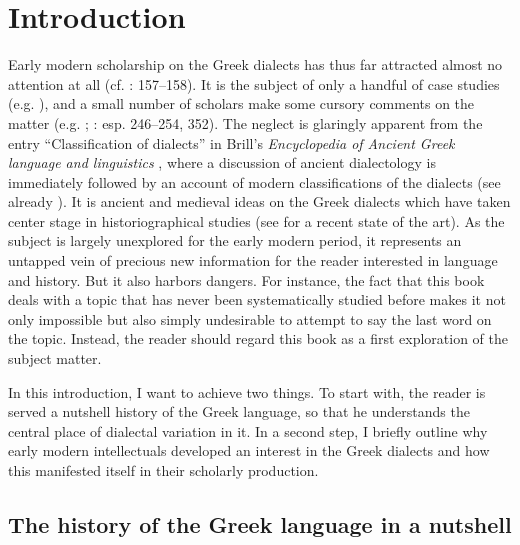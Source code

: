 \chapter{Introduction}\label{chap:1}

Early modern scholarship on the Greek dialects has thus far attracted almost no attention at all (cf. \citealt{Ben-Tov2009}: 157–158). It is the subject of only a handful of case studies (e.g. \citealt{VanRooy2016c}), and a small number of scholars make some cursory comments on the matter (e.g. \citealt{Botley2010}; \citealt{Roelcke2014}: esp. 246–254, 352). The neglect is glaringly apparent from the entry “Classification of dialects” in Brill’s \textit{Encyclopedia of Ancient Greek language and linguistics} \citep{Finkelberg2014}, where a discussion of ancient dialectology is immediately followed by an account of modern classifications of the dialects (see already \citealt{VanRooy2016a}). It is ancient and medieval ideas on the Greek dialects which have taken center stage in historiographical studies (see \citealt{VanRooy2018b} for a recent state of the art). As the subject is largely unexplored for the early modern period, it represents an untapped vein of precious new information for the reader interested in language and history. But it also harbors dangers. For instance, the fact that this book deals with a topic that has never been systematically studied before makes it not only impossible but also simply undesirable to attempt to say the last word on the topic. Instead, the reader should regard this book as a first exploration of the subject matter.

In this introduction, I want to achieve two things. To start with, the reader is served a nutshell history of the Greek language, so that he understands the central place of dialectal variation in it. In a second step, I briefly outline why early modern intellectuals developed an interest in the Greek dialects and how this manifested itself in their scholarly production.

\section{The history of the Greek language in a nutshell}\label{sec:1.1}

